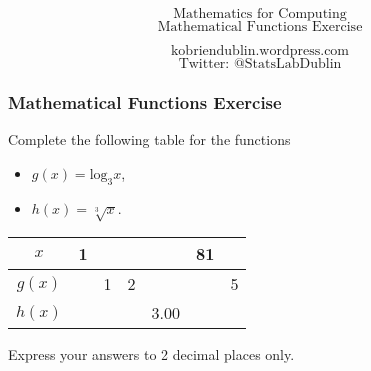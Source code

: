 \documentclass{beamer}
\begin{document}
\begin{frame}
\Huge
\[ \mbox{Mathematics for Computing} \]
\huge
\[ \mbox{Mathematical Functions Exercise} \]

\Large
\[ \mbox{kobriendublin.wordpress.com} \]
\[ \mbox{Twitter: @StatsLabDublin} \]

\end{frame}

\begin{frame}
\frametitle{Mathematical Functions Exercise}
\LARGE

Complete the following table for the functions 
\begin{itemize}
\item $g(x) = \mbox{log}_3x$,
\item $h(x) =\sqrt[3]{x}$.
\end{itemize} 
\begin{center}
\LARGE
\begin{tabular}{|c||c|c|c|c|c|c|}
\hline $x$ &  \phantom{p}1\phantom{p}&  &  &  & 81 &  \\ 
\hline \phantom{p} $g(x)$ \phantom{p}&  & \phantom{p}1\phantom{p} & \phantom{p}2\phantom{p} &  &  &  \phantom{p}5\phantom{p} \\ 
\hline \phantom{p}$h(x)$ \phantom{p}&  &  &  &  3.00 & \phantom{p}\phantom{p}\phantom{p}  &  \\ 
\hline 
\end{tabular} 
\end{center}
\Large
Express your answers to 2 decimal places only.
\end{frame}
\end{document}
